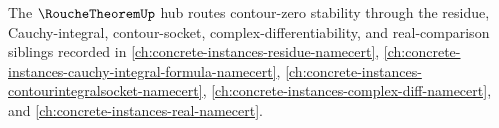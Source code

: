 The $\RoucheTheoremUp$ hub routes contour-zero stability through the residue, Cauchy-integral, contour-socket, complex-differentiability, and real-comparison siblings recorded in \autoref{ch:concrete-instances-residue-namecert}, \autoref{ch:concrete-instances-cauchy-integral-formula-namecert}, \autoref{ch:concrete-instances-contourintegralsocket-namecert}, \autoref{ch:concrete-instances-complex-diff-namecert}, and \autoref{ch:concrete-instances-real-namecert}.


